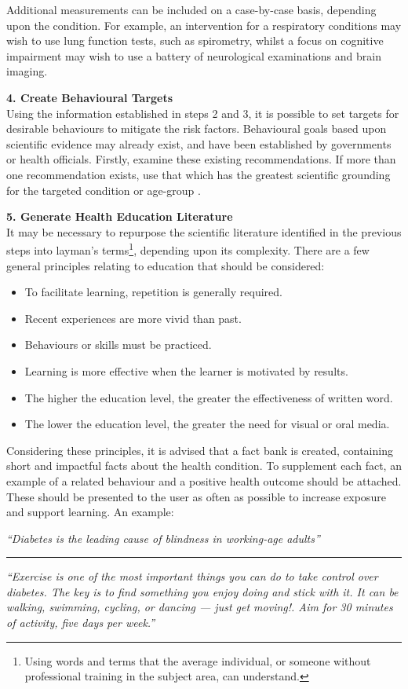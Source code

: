 Additional measurements can be included on a case-by-case basis, depending upon the condition. For example, an intervention for a respiratory conditions may wish to use lung function tests, such as spirometry, whilst a focus on cognitive impairment may wish to use a battery of neurological examinations and brain imaging.

\textbf{4. Create Behavioural Targets} \\
Using the information established in steps 2 and 3, it is possible to set targets for desirable behaviours to mitigate the risk factors. Behavioural goals based upon scientific evidence may already exist, and have been established by governments or health officials. Firstly, examine these existing recommendations. If more than one recommendation exists, use that which has the greatest scientific grounding for the targeted condition or age-group \cite{Stover2002, Pronk2004}.

\textbf{5. Generate Health Education Literature} \\
It may be necessary to repurpose the scientific literature identified in the previous steps into layman's terms\footnote{Using words and terms that the average individual, or someone without professional training in the subject area, can understand.}, depending upon its complexity.
There are a few general principles relating to education \cite{Gilbert2010} that should be considered:
\begin{itemize}[noitemsep,topsep=0pt]
\item To facilitate learning, repetition is generally required.
\item Recent experiences are more vivid than past.
\item Behaviours or skills must be practiced.
\item Learning is more effective when the learner is motivated by results.
\item The higher the education level, the greater the effectiveness of written word.
\item The lower the education level, the greater the need for visual or oral media.
\end{itemize}

Considering these principles, it is advised that a fact bank is created, containing short and impactful facts about the health condition. To supplement each fact, an example of a related behaviour and a positive health outcome should be attached. These should be presented to the user as often as possible to increase exposure and support learning. An example:
\begin{displayquote}
\textit{``Diabetes is the leading cause of blindness in working-age adults''}
\begin{center}
	\rule{1cm}{0.4pt}
\end{center}
\textit{``Exercise is one of the most important things you can do to take control over diabetes. The key is to find something you enjoy doing and stick with it. It can be walking, swimming, cycling, or dancing — just get moving!. Aim for 30 minutes of activity, five days per week.''}
\end{displayquote}

